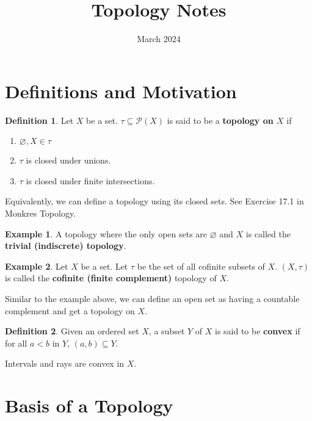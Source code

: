 \documentclass{article}
\title{Topology Notes}
\date{March 2024}
\theoremstyle{definition}
\newtheorem{definition}{Definition}
\newtheorem{example}{Example}[theorem]
\begin{document}
\maketitle

\section{Definitions and Motivation}

\begin{definition}
    Let $X$ be a set. $\tau \subseteq \mathcal{P}(X)$ is said to be a \textbf{topology on $X$} if

    \begin{enumerate}
        \item $\varnothing, X \in \tau$
        \item $\tau$ is closed under unions.
        \item $\tau$ is closed under finite intersections. 
    \end{enumerate}
\end{definition}

Equivalently, we can define a topology using its closed sets. See Exercise 17.1 in
Monkres Topology.




\begin{example}
    A topology where the only open sets are $\varnothing$ and $X$ is called the \textbf{trivial (indiscrete) topology}.
\end{example}

\begin{example}
    Let $X$ be a set. Let $\tau$ be the set of all cofinite subsets of $X$.
    $(X,\tau)$ is called the \textbf{cofinite (finite complement)} topology
    of $X$.
\end{example}

Similar to the example above, we can define an open set as having a countable
complement and get a topology on $X$.

\begin{definition}
    Given an ordered set $X$, a subset $Y$ of $X$ is said to be \textbf{convex}
    if for all $a < b$ in $Y$, $(a,b) \subseteq Y$.
\end{definition}

Intervals and rays are convex in $X$.

\newpage

\section{Basis of a Topology}
\end{document}
